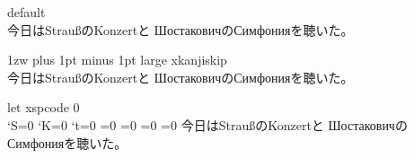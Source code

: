 \documentclass{ujarticle}
\begin{document}
default\\
\selectfont
今日はStraußのKonzertと
\selectfont
ШостаковичのСимфонияを聴いた。

\xkanjiskip1zw plus 1pt minus 1pt
large \bs xkanjiskip\\
\selectfont
今日はStraußのKonzertと
\selectfont
ШостаковичのСимфонияを聴いた。

let xspcode 0\\
\xspcode`S=0
\xspcode`K=0
\xspcode`t=0
=0%
=0%
=0%
=0%
\selectfont
今日はStraußのKonzertと
\selectfont
ШостаковичのСимфонияを聴いた。
\end{document}
